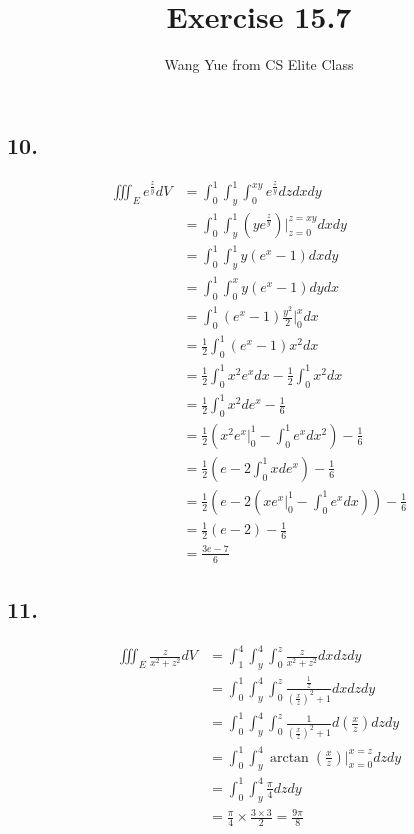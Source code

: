 \documentclass{article}
\begin{document}
  \title{Exercise 15.7}
  \author{Wang Yue from CS Elite Class}
  \maketitle
  \date{}

  \subsection*{10. }

  $$\begin{aligned}
    \iiint_E e^{\frac z y} dV &= \int_0^1 \int_y^1 \int_{0}^{xy} e^{\frac z y} dz dx dy \\
    &= \int_0^1 \int_y^1 (ye^{\frac z y})\biggl|_{z=0}^{z=xy} dx dy \\
    &= \int_0^1 \int_y^1 y(e^x - 1) dx dy \\
    &= \int_0^1 \int_0^x y(e^x - 1) dy dx \\
    &= \int_0^1 (e^x - 1) \frac{y^2}{2}\biggl|_0^x dx \\
    &= \frac 1 2 \int_0^1 (e^x - 1) x^2 dx \\
    &= \frac 1 2 \int_0^1 x^2 e^x dx - \frac 1 2 \int_0^1 x^2 dx \\
    &= \frac 1 2 \int_0^1 x^2 de^x - \frac 1 6 \\
    &= \frac 1 2 (x^2e^x\biggl|_0^1 - \int_0^1 e^x dx^2) - \frac 1 6 \\
    &= \frac 1 2 (e - 2\int_0^1xde^x) - \frac 1 6 \\
    &= \frac 1 2 (e - 2(xe^x\biggl|_0^1 - \int_0^1 e^x dx)) - \frac 1 6 \\
    &= \frac 1 2 (e - 2) - \frac 1 6 \\
    &= \frac{3e - 7}{6}
  \end{aligned}$$

  \subsection*{11. }
  $$\begin{aligned}
    \iiint_E \frac{z}{x^2+z^2} dV &= \int_1^4 \int_y^4 \int_0^z \frac{z}{x^2+z^2} dx dz dy \\
    &= \int_0^1 \int_y^4 \int_0^z \frac{\frac 1 z}{(\frac x z)^2 + 1} dx dz dy \\
    &= \int_0^1 \int_y^4 \int_0^z \frac{1}{(\frac x z)^2 + 1} d(\frac x z) dz dy \\
    &= \int_0^1 \int_y^4 \arctan(\frac x z)\biggl|_{x=0}^{x=z} dz dy \\
    &= \int_0^1 \int_y^4 \frac \pi 4 dz dy \\
    &= \frac \pi 4 \times \frac{3 \times 3}{2} = \frac{9\pi}{8}
  \end{aligned}$$
\end{document}
